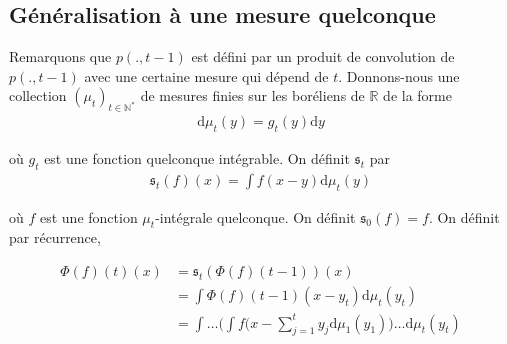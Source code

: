 \documentclass{article}
\begin{document}
\subsection{Généralisation à une mesure quelconque}
Remarquons que $p(.,t-1)$ est défini par un produit de convolution de $p(.,t-1)$ avec une certaine mesure qui dépend de $t$. Donnons-nous une collection $(\mu_t)_{t\in\mathbb{N}^*}$ de mesures finies sur les boréliens de $\mathbb{R}$ de la forme  
\begin{align*}
	\mathrm{d}\mu_t(y) = g_t(y)\mathrm{d}y
\end{align*}

où $g_t$ est une fonction quelconque intégrable. On définit $\mathfrak{s}_t$ par
\begin{align}
	\mathfrak{s}_t(f)(x) =\int f(x-y)\mathrm{d}\mu_t(y)
\end{align}

où $f$ est une fonction $\mu_t$-intégrale quelconque. On définit $\mathfrak{s}_0(f) = f$. On définit par récurrence, 

\begin{align*}
	\Phi(f)(t)(x) &= \mathfrak{s}_t(\Phi(f)(t-1))(x)\\
		      &=\int \Phi(f)(t-1)(x-y_t)\mathrm{d}\mu_t(y_t)\\
		      &=\int \ldots \bigg(\int f(x-\sum_{j=1}^t y_j \mathrm{d}\mu_1(y_1)\bigg)\ldots \mathrm{d}\mu_t(y_t)
\end{align*}
\end{document}
